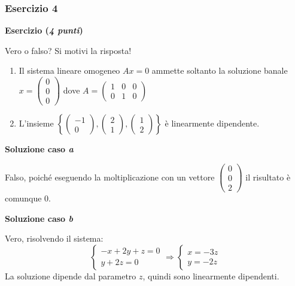 \documentclass[a4paper]{article}
\begin{document}
	\subsubsection{Esercizio 4}
	
	\textcolor{Red3}{\textbf{Esercizio (\emph{4 punti})}}\newline
	
	\noindent
	Vero o falso? Si motivi la risposta!
	\begin{enumerate}[label=(\alph*)]
		\item Il sistema lineare omogeneo $Ax = 0$ ammette soltanto la soluzione banale $x = \begin{pmatrix}
			0 \\
			0 \\
			0
		\end{pmatrix}$ dove $A = \begin{pmatrix}
			1 & 0 & 0 \\
			0 & 1 & 0
		\end{pmatrix}$
		
		\item L'insieme $\left\{\begin{pmatrix}
			-1 \\
			0
		\end{pmatrix}, \begin{pmatrix}
			2 \\
			1
		\end{pmatrix}, \begin{pmatrix}
			1 \\
			2
		\end{pmatrix}\right\}$ è linearmente dipendente.
	\end{enumerate}
	
	\noindent
	\textcolor{Green4}{\textbf{Soluzione caso \emph{a}}}\newline
	
	\noindent
	Falso, poiché eseguendo la moltiplicazione con un vettore $\begin{pmatrix}
		0 \\
		0 \\
		2
	\end{pmatrix}$ il risultato è comunque $0$.\newline

	\noindent
	\textcolor{Green4}{\textbf{Soluzione caso \emph{b}}}\newline
	
	\noindent
	Vero, risolvendo il sistema:
	\begin{equation*}
		\begin{cases}
			-x + 2y + z = 0 \\
			y + 2z = 0
		\end{cases} \Longrightarrow
		\begin{cases}
			x = -3z \\
			y = -2z
		\end{cases}
	\end{equation*}
	La soluzione dipende dal parametro $z$, quindi sono linearmente dipendenti.
\end{document}
